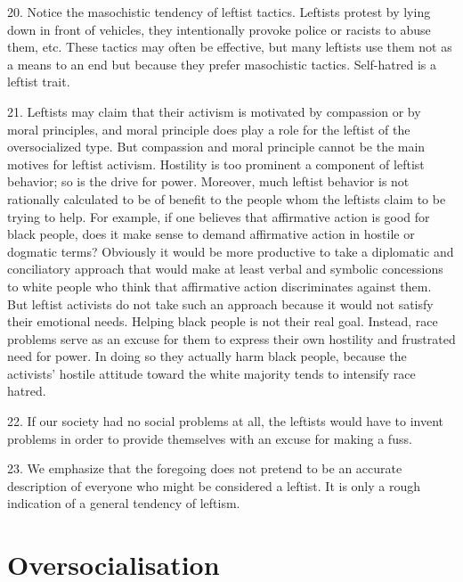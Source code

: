 \documentclass{article}
\begin{document}
20.  Notice the masochistic tendency of leftist tactics.  Leftists protest by lying down in front of 
vehicles, they intentionally provoke police or racists to abuse them, etc.  These tactics may often 
be  effective,  but  many  leftists  use  them  not  as  a  means  to  an  end  but  because  they  prefer 
masochistic tactics.  Self-hatred is a leftist trait. \vspace{\baselineskip}

21.  Leftists may claim that their activism is motivated by compassion or by moral principles, and 
moral  principle  does  play  a  role  for  the  leftist  of  the  oversocialized  type.   But  compassion  and  
moral  principle  cannot  be  the  main  motives  for  leftist  activism.   Hostility  is  too  prominent  a  
component of leftist behavior; so is the drive for power.  Moreover, much leftist behavior is not 
rationally calculated to be of benefit to the people whom the leftists claim to be trying to help.  For 
example,  if  one  believes  that  affirmative  action  is  good  for  black  people,  does  it  make  sense  to  
demand affirmative action in hostile or dogmatic terms? Obviously it would be more productive 
to  take  a  diplomatic  and  conciliatory  approach  that  would  make  at  least  verbal  and  symbolic  
concessions  to  white  people  who  think  that  affirmative  action  discriminates  against  them.   But 
leftist  activists  do  not  take  such  an  approach  because  it  would  not  satisfy  their  emotional  
needs.  Helping black people is not their real goal.  Instead, race problems serve as an excuse for 
them to express their own hostility and frustrated need for power.  In doing so they actually harm 
black  people,  because  the  activists’  hostile  attitude  toward  the  white  majority  tends  to  intensify  
race hatred. \vspace{\baselineskip}

22.  If our society had no social problems at all, the leftists would have to invent problems in order 
to provide themselves with an excuse for making a fuss. \vspace{\baselineskip} \newpage

23.  We emphasize that the foregoing does not pretend to be an accurate description of everyone 
who might be considered a leftist.  It is only a rough indication of a general tendency of leftism. \vspace{\baselineskip}


\section{Oversocialisation}
\end{document}
